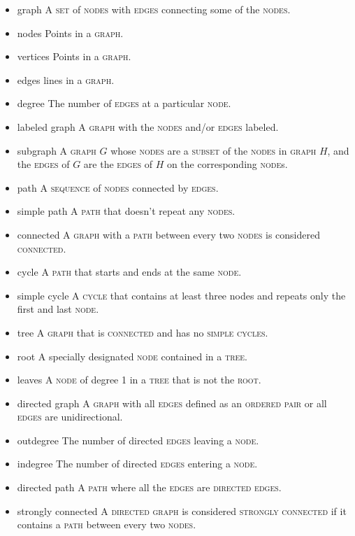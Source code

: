 \documentclass{article}
\newcommand{\term}[1]{\textsc{#1}}
\begin{document}
\bigskip \indent
\begin{itemize}
\item graph
  \subitem A \term{set} of \term{nodes} with \term{edges} connecting some of the \term{nodes}.
\item nodes
  \subitem Points in a \term{graph}.
\item vertices
  \subitem Points in a \term{graph}.
\item edges
  \subitem lines in a \term{graph}.
\item degree
  \subitem The number of \term{edges} at a particular \term{node}.
\item labeled graph
  \subitem A \term{graph} with the \term{nodes} and/or \term{edges} labeled.
\item subgraph
  \subitem A \term{graph} $G$ whose \term{nodes} are a \term{subset} of the \term{nodes} in \term{graph} $H$, and the \term{edges} of $G$ are the \term{edges} of $H$ on the corresponding \term{node}s.
\item path
  \subitem A \term{sequence} of \term{nodes} connected by \term{edges}.
\item simple path
  \subitem A \term{path} that doesn't repeat any \term{nodes}.
\item connected
  \subitem A \term{graph} with a \term{path} between every two \term{nodes} is considered \term{connected}.
\item cycle
  \subitem A \term{path} that starts and ends at the same \term{node}.
\item simple cycle
  \subitem A \term{cycle} that contains at least three nodes and repeats only the first and last \term{node}.
\item tree
  \subitem A \term{graph} that is \term{connected} and has no \term{simple cycles}.
\item root
  \subitem A specially designated \term{node} contained in a \term{tree}.
\item leaves
  \subitem A \term{node} of degree 1 in a \term{tree} that is not the \term{root}.
\item directed graph
  \subitem A \term{graph} with all \term{edges} defined as an \term{ordered pair} or all \term{edges} are unidirectional.
\item outdegree
  \subitem The number of directed \term{edges} leaving a \term{node}.
\item indegree
  \subitem The number of directed \term{edges} entering a \term{node}.
\item directed path
  \subitem A \term{path} where all the \term{edges} are \term{directed edges}.
\item strongly connected
  \subitem A \term{directed graph} is considered \term{strongly connected} if it contains a \term{path} between every two \term{nodes}.
\end{itemize}
   
\end{document}

